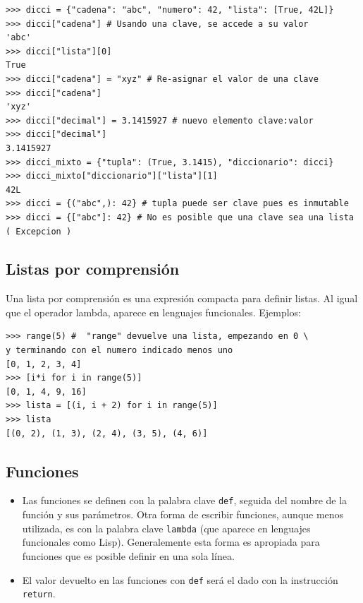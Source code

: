 \begin{lstlisting}
>>> dicci = {"cadena": "abc", "numero": 42, "lista": [True, 42L]}
>>> dicci["cadena"] # Usando una clave, se accede a su valor
'abc'
>>> dicci["lista"][0]
True
>>> dicci["cadena"] = "xyz" # Re-asignar el valor de una clave
>>> dicci["cadena"]
'xyz'
>>> dicci["decimal"] = 3.1415927 # nuevo elemento clave:valor
>>> dicci["decimal"]
3.1415927
>>> dicci_mixto = {"tupla": (True, 3.1415), "diccionario": dicci}
>>> dicci_mixto["diccionario"]["lista"][1]
42L
>>> dicci = {("abc",): 42} # tupla puede ser clave pues es inmutable
>>> dicci = {["abc"]: 42} # No es posible que una clave sea una lista
( Excepcion )
\end{lstlisting}



\subsection{Listas por comprensión}
Una lista por comprensión es una expresión compacta para definir listas. Al igual que el operador lambda, aparece en lenguajes funcionales. Ejemplos:


\begin{lstlisting}
>>> range(5) #  "range" devuelve una lista, empezando en 0 \
y terminando con el numero indicado menos uno
[0, 1, 2, 3, 4]
>>> [i*i for i in range(5)]
[0, 1, 4, 9, 16]
>>> lista = [(i, i + 2) for i in range(5)]
>>> lista
[(0, 2), (1, 3), (2, 4), (3, 5), (4, 6)]
\end{lstlisting}



\subsection{Funciones}
\begin{itemize}

  \item  Las funciones se definen con la palabra clave \verb~def~, seguida del nombre de la función y sus parámetros. Otra forma de escribir funciones, aunque menos utilizada, es con la palabra clave \verb~lambda~ (que aparece en lenguajes funcionales como Lisp). Generalemente esta forma es apropiada para funciones que es posible definir en una sola línea.

  \item  El valor devuelto en las funciones con \verb~def~ será el dado con la instrucción \verb~return~.
  \end{itemize}


